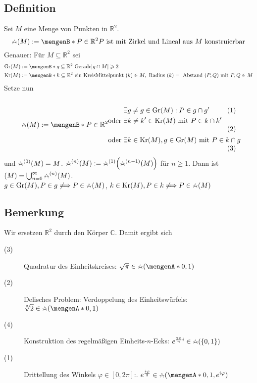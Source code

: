 \subsection[Definition: Aus $M \subset \mathds{R}^2$ konstruierbar]{Definition} %
\label{sub:103}
Sei $M$ eine Menge von Punkten in $\mathds{R}^2$. 
\[
	\zirkel(M) := \set[P \in \mathds{R}^2]{ P \text{ ist mit Zirkel und Lineal aus } M \text{ konstruierbar}} 
\]
Genauer: Für $M \subseteq \mathds{R}^2$ sei   
\begin{align*}
	\Gr(M) &:= \set[g \subseteq \mathds{R}^2 \text{ Gerade}]{\abs*{g \cap M}\ge 2 } \\
	\Kr(M) &:= \set[k \subseteq \mathds{R}^2 \text{ ein Kreis}]{\text{Mittelpunkt }(k) \in M , \text{ Radius }(k) = \text{ Abstand }(P,Q) \text{ mit } P,Q \in M} 
\end{align*}
Setze nun
\[
	\zirkel (M) := \set[P \in \mathds{R}^2]{
	\vcenter{\hbox{\begin{minipage}[b]{6.5cm}
		\begin{align*}
			&\exists g \not= g \in \Gr(M) : P \in g \cap g' \\
					\text{oder } &\exists k \not= k' \in \Kr(M) \text{ mit } P \in k \cap k' \\
					\text{oder } &\exists k \in \Kr(M), g \in \Gr(M) \text{ mit } P \in k \cap g
		\end{align*}
	\end{minipage}}}} 
\]
und $\zirkel^{(0)}(M) = M$. $\zirkel^{(n)}(M) := \zirkel^{(1)} \enbrace*{\zirkel^{(n-1)}(M)} $ für $n \ge 1$. Dann ist $(M) = \bigcup_{n=0}^\infty \zirkel^{(n)}(M)	$. \\
 $g \in \Gr(M), P \in g \not\Longrightarrow P \in \zirkel(M)$, $k \in \Kr(M), P \in k \not\Longrightarrow P \in \zirkel(M)$

\subsection[Bemerkung: Übersetzung der Konstruktionsprobleme in Zahlen aus $\mathds{C}$]{Bemerkung} %
\label{sub:104}
Wir ersetzen $\mathds{R}^2$ durch den Körper $\mathds{C}$. Damit ergibt sich 
\begin{description}
	\item[(3)] Quadratur des Einheitskreises: $\sqrt{\pi }  \in \zirkel(\set{0,1})$
	\item[(2)]\label{delisches} Delisches Problem: Verdoppelung des Einheitswürfels: $\sqrt[3]{2} \in \zirkel (\set{0,1}) $
	\item[(4)] Konstruktion des regelmäßigen Einheits-$n$-Ecks: $e^{\frac{2 \pi }{n} i} \in \zirkel(\{0,1\})$ 
	\item[(1)] Drittellung des Winkels $\varphi \in [0, 2\pi ]$:. $e^{\frac{i \varphi}{3} } \in \zirkel(\set{0,1, e^{i \varphi}} )$
\end{description}

